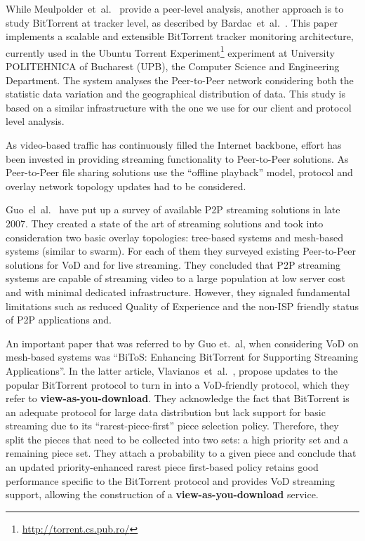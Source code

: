 While Meulpolder~et~al.~\cite{p2p09} provide a peer-level analysis, another
approach is to study BitTorrent at tracker level, as described by
Bardac~et~al.~\cite{tracker-mon}. This paper implements a scalable and
extensible BitTorrent tracker monitoring architecture, currently used in the
Ubuntu Torrent Experiment\footnote{\url{http://torrent.cs.pub.ro/}} experiment
at University POLITEHNICA of Bucharest (UPB), the Computer Science and
Engineering Department. The system analyses the Peer-to-Peer network
considering both the statistic data variation and the geographical
distribution of data. This study is based on a similar infrastructure with the
one we use for our client and protocol level analysis.

As video-based traffic has continuously filled the Internet backbone, effort
has been invested in providing streaming functionality to Peer-to-Peer
solutions.  As Peer-to-Peer file sharing solutions use the ``offline
playback'' model, protocol and overlay network topology updates had to be
considered.

Guo~el~al.~\cite{p2p-streaming-survey} have put up a survey of available P2P
streaming solutions in late 2007. They created a state of the art of streaming
solutions and took into consideration two basic overlay topologies: tree-based
systems and mesh-based systems (similar to swarm). For each of them they
surveyed existing Peer-to-Peer solutions for VoD and for live streaming. They
concluded that P2P streaming systems are capable of streaming video to a large
population at low server cost and with minimal dedicated infrastructure.
However, they signaled fundamental limitations such as reduced Quality of
Experience and the non-ISP friendly status of P2P applications and.

An important paper that was referred to by Guo et.~al, when considering VoD on
mesh-based systems was ``BiToS: Enhancing BitTorrent for Supporting Streaming
Applications''. In the latter article, Vlavianos~et~al.~\cite{bitos}, propose
updates to the popular BitTorrent protocol to turn in into a VoD-friendly
protocol, which they refer to \textbf{view-as-you-download}. They acknowledge
the fact that BitTorrent is an adequate protocol for large data distribution
but lack support for basic streaming due to its ``rarest-piece-first'' piece
selection policy. Therefore, they split the pieces that need to be collected
into two sets: a high priority set and a remaining piece set. They attach a
probability to a given piece and conclude that an updated priority-enhanced
rarest piece first-based policy retains good performance specific to the
BitTorrent protocol and provides VoD streaming support, allowing the
construction of a \textbf{view-as-you-download} service.

